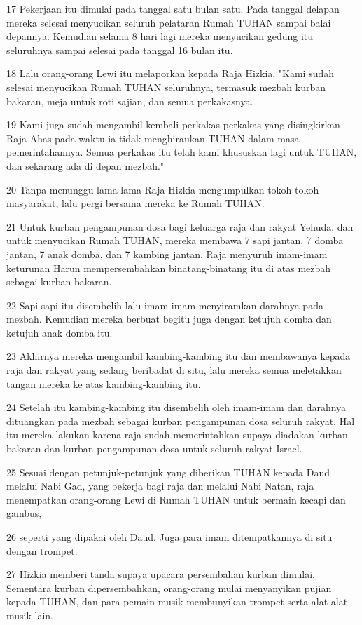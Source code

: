 \par 17 Pekerjaan itu dimulai pada tanggal satu bulan satu. Pada tanggal delapan mereka selesai menyucikan seluruh pelataran Rumah TUHAN sampai balai depannya. Kemudian selama 8 hari lagi mereka menyucikan gedung itu seluruhnya sampai selesai pada tanggal 16 bulan itu.
\par 18 Lalu orang-orang Lewi itu melaporkan kepada Raja Hizkia, "Kami sudah selesai menyucikan Rumah TUHAN seluruhnya, termasuk mezbah kurban bakaran, meja untuk roti sajian, dan semua perkakasnya.
\par 19 Kami juga sudah mengambil kembali perkakas-perkakas yang disingkirkan Raja Ahas pada waktu ia tidak menghiraukan TUHAN dalam masa pemerintahannya. Semua perkakas itu telah kami khususkan lagi untuk TUHAN, dan sekarang ada di depan mezbah."
\par 20 Tanpa menunggu lama-lama Raja Hizkia mengumpulkan tokoh-tokoh masyarakat, lalu pergi bersama mereka ke Rumah TUHAN.
\par 21 Untuk kurban pengampunan dosa bagi keluarga raja dan rakyat Yehuda, dan untuk menyucikan Rumah TUHAN, mereka membawa 7 sapi jantan, 7 domba jantan, 7 anak domba, dan 7 kambing jantan. Raja menyuruh imam-imam keturunan Harun mempersembahkan binatang-binatang itu di atas mezbah sebagai kurban bakaran.
\par 22 Sapi-sapi itu disembelih lalu imam-imam menyiramkan darahnya pada mezbah. Kemudian mereka berbuat begitu juga dengan ketujuh domba dan ketujuh anak domba itu.
\par 23 Akhirnya mereka mengambil kambing-kambing itu dan membawanya kepada raja dan rakyat yang sedang beribadat di situ, lalu mereka semua meletakkan tangan mereka ke atas kambing-kambing itu.
\par 24 Setelah itu kambing-kambing itu disembelih oleh imam-imam dan darahnya dituangkan pada mezbah sebagai kurban pengampunan dosa seluruh rakyat. Hal itu mereka lakukan karena raja sudah memerintahkan supaya diadakan kurban bakaran dan kurban pengampunan dosa untuk seluruh rakyat Israel.
\par 25 Sesuai dengan petunjuk-petunjuk yang diberikan TUHAN kepada Daud melalui Nabi Gad, yang bekerja bagi raja dan melalui Nabi Natan, raja menempatkan orang-orang Lewi di Rumah TUHAN untuk bermain kecapi dan gambus,
\par 26 seperti yang dipakai oleh Daud. Juga para imam ditempatkannya di situ dengan trompet.
\par 27 Hizkia memberi tanda supaya upacara persembahan kurban dimulai. Sementara kurban dipersembahkan, orang-orang mulai menyanyikan pujian kepada TUHAN, dan para pemain musik membunyikan trompet serta alat-alat musik lain.
